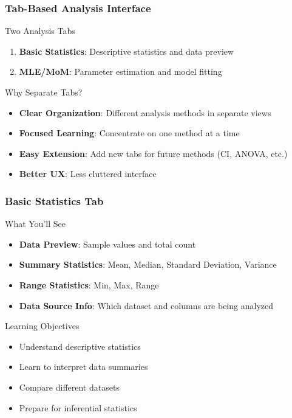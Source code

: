 \documentclass[aspectratio=169]{beamer}
\begin{document}
\begin{frame}
\frametitle{Tab-Based Analysis Interface}
\begin{alertblock}{Two Analysis Tabs}
\begin{enumerate}
\item \textbf{Basic Statistics}: Descriptive statistics and data preview
\item \textbf{MLE/MoM}: Parameter estimation and model fitting
\end{enumerate}
\end{alertblock}

\begin{exampleblock}{Why Separate Tabs?}
\begin{itemize}
\item \textbf{Clear Organization}: Different analysis methods in separate views
\item \textbf{Focused Learning}: Concentrate on one method at a time
\item \textbf{Easy Extension}: Add new tabs for future methods (CI, ANOVA, etc.)
\item \textbf{Better UX}: Less cluttered interface
\end{itemize}
\end{exampleblock}
\end{frame}

\begin{frame}
\frametitle{Basic Statistics Tab}
\begin{alertblock}{What You'll See}
\begin{itemize}
\item \textbf{Data Preview}: Sample values and total count
\item \textbf{Summary Statistics}: Mean, Median, Standard Deviation, Variance
\item \textbf{Range Statistics}: Min, Max, Range
\item \textbf{Data Source Info}: Which dataset and columns are being analyzed
\end{itemize}
\end{alertblock}

\begin{exampleblock}{Learning Objectives}
\begin{itemize}
\item Understand descriptive statistics
\item Learn to interpret data summaries
\item Compare different datasets
\item Prepare for inferential statistics
\end{itemize}
\end{exampleblock}
\end{frame}
\end{document}
